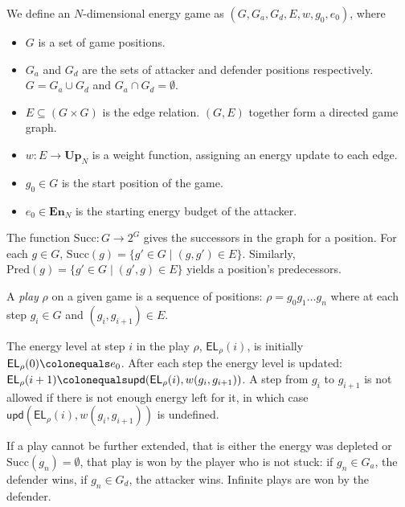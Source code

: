 \begin{definition}\label{def:energy_game}
    We define an $N$-dimensional energy game as
    $(G, G_a, G_d, E, w, g_0, e_0)$, where
    \begin{itemize}
        \item $G$ is a set of game positions.
        \item $G_a$ and $G_d$ are the sets of attacker and defender positions
            respectively.
            $G = G_a \cup G_d$ and $G_a \cap G_d = \emptyset$.
        \item $E \subseteq (G \times G)$ is the edge relation. $(G, E)$
            together form a directed game graph.
        \item $w: E \rightarrow \mathbf{Up}_N$ is a weight function, assigning an
            energy update to each edge.
        \item $g_0 \in G$ is the start position of the game.
        \item $e_0 \in \mathbf{En}_N$ is the starting energy budget of the attacker.
    \end{itemize}

    The function $\mathrm{Succ}: G \rightarrow 2^G$ gives the successors in the
    graph for a position.
    For each $g \in G$, $\mathrm{Succ}(g) = \{g' \in G \mid (g, g') \in E\}$.
    Similarly, $\mathrm{Pred}(g) = \{g' \in G \mid (g', g) \in E\}$ yields a
    position's predecessors.
\end{definition}

\begin{definition}
    A \emph{play} $\rho$ on a given game is a sequence of positions:
    $\rho = g_0g_1 \ldots g_n$ where at each step
    $g_i \in G$ and $(g_i, g_{i+1}) \in E$.

    The energy level at step $i$ in the play $\rho$, $\mathsf{EL}_\rho(i)$,
    is initially $\mathsf{EL}_\rho(0) \colonequals e_0$.
    After each step the energy level is updated:
    $\mathsf{EL}_\rho(i + 1) \colonequals
        \mathsf{upd}(\mathsf{EL}_\rho(i), w(g_i, g_{i+1}))$.
    A step from $g_i$ to $g_{i+1}$ is not allowed
    if there is not enough energy left for it,
    in which case $\mathsf{upd}(\mathsf{EL}_\rho(i), w(g_i, g_{i+1}))$ is undefined.

    If a play cannot be further extended,
    that is either the energy was depleted or
    $\mathrm{Succ}(g_n) = \emptyset$,
    that play is won by the player who is not stuck:
    if $g_n \in G_a$, the defender wins, if $g_n \in G_d$, the attacker wins.
    Infinite plays are won by the defender.
\end{definition}

